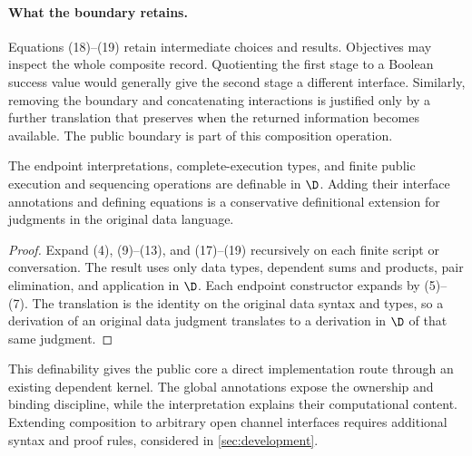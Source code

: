 \paragraph{What the boundary retains.}
Equations (18)--(19) retain intermediate choices and results. Objectives may
inspect the whole composite record. Quotienting the first stage to a Boolean
success value would generally give the second stage a different interface.
Similarly, removing the boundary and concatenating interactions is justified
only by a further translation that preserves when the returned information
becomes available. The public boundary is part of this composition operation.

\begin{proposition}
\label{prop:definability}
The endpoint interpretations, complete-execution types, and finite public
execution and sequencing operations are definable in $\D$. Adding their
interface annotations and defining equations is a conservative definitional
extension for judgments in the original data language.
\end{proposition}
\begin{proof}
Expand (4), (9)--(13), and (17)--(19) recursively on each finite script or
conversation. The result uses only data types, dependent sums and products,
pair elimination, and application in $\D$. Each endpoint constructor expands
by (5)--(7). The translation is the identity on the original data syntax and
types, so a derivation of an original data judgment translates to a derivation
in $\D$ of that same judgment.
\end{proof}

This definability gives the public core a direct implementation route through
an existing dependent kernel. The global annotations expose the ownership and
binding discipline, while the interpretation explains their computational
content. Extending composition to arbitrary open channel interfaces requires
additional syntax and proof rules, considered in \cref{sec:development}.
